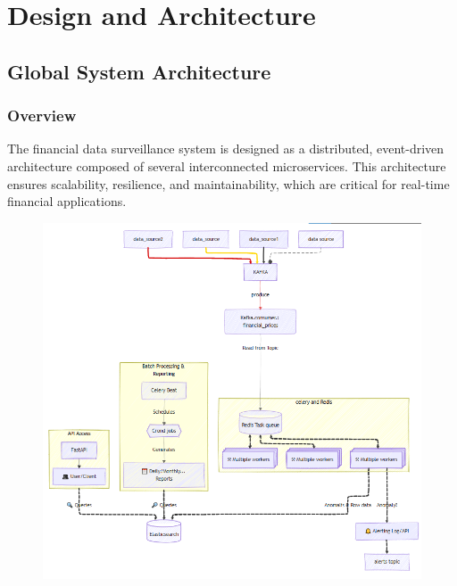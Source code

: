 

\chapter{Design and Architecture}


\section{Global System Architecture}

\subsection{Overview}

The financial data surveillance system is designed as a distributed, event-driven architecture composed of several interconnected microservices. This architecture ensures scalability, resilience, and maintainability, which are critical for real-time financial applications.

\begin{figure}[H]
    \centering
    \includegraphics[width=\textwidth]{figures/global.png}
\end{figure}

